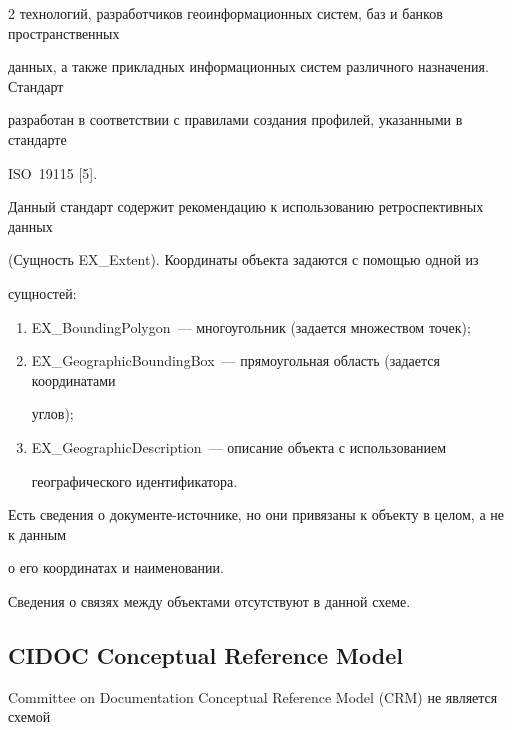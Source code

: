 \begin{multicols}{2}
технологий, разработчиков геоинформационных систем, баз и банков пространственных 

данных, а также прикладных информационных систем различного назначения. Стандарт 

разработан в соответствии с правилами создания профилей, указанными в стандарте 

{ISO}~19115 [5].

  

  Данный стандарт содержит рекомендацию к использованию ретроспективных данных 

(Сущность {EX\_Extent}). Координаты объекта задаются с по\-мощью одной из 

сущностей:

  \begin{enumerate}[(1)]

\item {EX\_BoundingPolygon}~--- многоугольник (задается множеством точек);\\[-14pt]

\item {EX\_GeographicBoundingBox}~--- прямоугольная область (задается координатами 

углов);\\[-14pt]

\item {EX\_GeographicDescription}~--- описание объекта с использованием 

географического идентификатора.

\end{enumerate}

  

  Есть сведения о документе-источнике, но они привязаны к объекту в целом, а не к данным 

о его координатах и наименовании.

  

  Сведения о связях между объектами отсутствуют в данной схеме.

  

     \vspace*{-6pt}



  \subsection{CIDOC Conceptual Reference Model}

  

{Committee on Documentation Conceptual Reference Model} (CRM) не является схемой 


\end{multicols}
